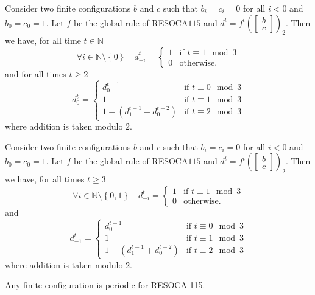 \documentclass[10pt,a4paper]{amsart}
\newcommand{\N}{\ensuremath{\mathbb{N}}\xspace}
\newcommand{\RESOCA}{RESOCA\xspace}
\newcommand{\cvres}[2]{\ensuremath{\begin{bmatrix}#1\\#2\end{bmatrix}}\xspace}
\newcommand{\set}[1]{\ensuremath{\left\{#1\right\}}\xspace}
\begin{document}
\begin{lemma}
\label{lem:periodicity-3}
 Consider two finite configurations $b$ and $c$ such that $b_i=c_i=0$ for all $i<0$ and $b_0=c_0=1$. Let $f$ be the global rule of \RESOCA $115$ and $d^t=f^t\left(\cvres{b}{c}\right)_2$. Then we have, for all time $t\in\N$
 \[
 \forall i\in\N\setminus\set{0}\quad d^t_{-i}=
 \begin{cases}
 1&\text{if\ }t\equiv1\mod3\\
 0&\text{otherwise.}
 \end{cases}
 \]
 and for all times $t\geq2$
 \[
 d^t_0= \begin{cases}
 d^{t-1}_0&\text{if\ }t\equiv0\mod3\\
 1&\text{if\ }t\equiv1\mod3\\
 1-(d^{t-1}_1+d^{t-2}_0)&\text{if\ }t\equiv2\mod3
 \end{cases}
 \]
 where addition is taken modulo $2$.
\end{lemma}

\begin{lemma}
\label{lem:periodicity-4}
  Consider two finite configurations $b$ and $c$ such that $b_i=c_i=0$ for all $i<0$ and $b_0=c_0=1$. Let $f$ be the global rule of \RESOCA $115$ and $d^t=f^t\left(\cvres{b}{c}\right)_2$. Then we have, for all times $t\geq3$
 \[
 \forall i\in\N\setminus\set{0,1}\quad d^t_{-i}=
 \begin{cases}
 1&\text{if\ }t\equiv1\mod3\\
 0&\text{otherwise.}
 \end{cases}
 \]
 and
 \[
 d^t_{-1}= \begin{cases}
 d^{t-1}_0&\text{if\ }t\equiv0\mod3\\
 1&\text{if\ }t\equiv1\mod3\\
 1-(d^{t-1}_1+d^{t-2}_0)&\text{if\ }t\equiv2\mod3
 \end{cases}
 \]
 where addition is taken modulo $2$.
\end{lemma}

\begin{theorem}
\label{th:all-finite-cfg-are-periodic}
    Any finite configuration is periodic for RESOCA 115.
\end{theorem}
\end{document}
